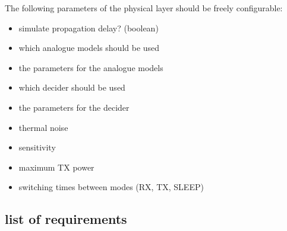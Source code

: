 The following parameters of the physical layer should be freely configurable:

\begin{itemize}
	\item simulate propagation delay? (boolean)
	\item which analogue models should be used
	\item the parameters for the analogue models
	\item which decider should be used
	\item the parameters for the decider
	\item thermal noise
	\item sensitivity
	\item maximum TX power
	\item switching times between modes (RX, TX, SLEEP)
\end{itemize}

\subsection{list of requirements}

